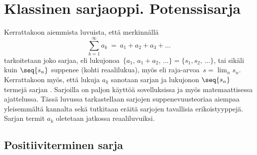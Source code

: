 \section{Klassinen sarjaoppi. Potenssisarja} \label{potenssisarja}
\alku
{}

Kerrattakoon aiemmista luvuista, että merkinnällä
\[
\sum_{k=1}^\infty a_k\ =\ a_1 + a_2 + a_3 + \ldots
\]
tarkoitetaan joko sarjaa, eli lukujonoa 
$\,\{a_1,\,a_1 + a_2,\,\ldots\} = \{s_1,s_2,\,\ldots\}$, tai sikäli kuin $\seq{s_n}$ suppenee
(kohti reaalilukua), myös  eli raja-arvoa $\,s = \lim_n s_n$. Kerrattakoon
myös, että lukuja $a_k$ sanotaan sarjan  ja lukujonon $\seq{s_n}$ termejä sarjan
. Sarjoilla on paljon käyttöä sovelluksissa ja myös matemaattisessa
ajattelussa. Tässä luvussa tarkastellaan sarjojen suppenevuusteoriaa aiempaa yleisemmältä
kannalta sekä tutkitaan eräitä sarjojen tavallisia erikoistyyppejä. Sarjan termit $a_k$
oletetaan jatkossa reaaliluvuiksi.

\subsection{Positiiviterminen sarja}
%

